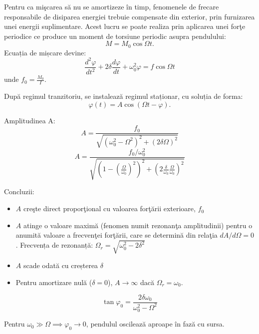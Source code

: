 \documentclass[a4paper]{article}
\renewcommand{\phi}{\varphi} %
\renewcommand{\Omega}{\varOmega} %
\begin{document}
Pentru ca mişcarea să nu se amortizeze în timp, fenomenele de frecare
responsabile de disiparea energiei trebuie compensate din exterior, prin
furnizarea unei energii suplimentare. Acest lucru se poate realiza prin
aplicarea unei forţe periodice ce produce un moment de torsiune periodic asupra
pendulului:
\begin{equation}
	M = M_0 \cos \Omega t \text{.}
\end{equation}
Ecuația de mișcare devine:
\begin{equation}
	\frac{d^2 \phi}{dt^2} + 2 \delta \frac{d \phi}{dt} + \omega_0^2 \phi = f
	\cos \Omega t
\end{equation}
unde $f_0 = \frac{M_0}{I}$.

După regimul tranzitoriu, se instalează regimul staționar, cu soluția de forma:
\begin{equation}
	\phi(t) = A \cos(\Omega t - \phi) \text{.}
\end{equation}

Amplitudinea A:
\begin{equation}
	A = \frac{f_0}{\sqrt{(\omega_0^2 - \Omega^2)^2 + (2 \delta \Omega)^2}}
\end{equation}
\begin{equation}
	A = \frac{f_0 / \omega_0^2}{\sqrt{\left(1 -
			\left(\frac{\Omega}{\omega_0}\right)^2\right)^2 + \left(2
			\frac{\delta}{\omega_0} \frac{\Omega}{\omega_0} \right)^2}}
\end{equation}

Concluzii:
\begin{itemize}
	\item $A$ creşte direct proporţional cu valoarea forţării exterioare, $f_0$
	\item $A$ atinge o valoare maximă (fenomen numit rezonanţa amplitudinii) pentru o anumită valoare a
	      frecvenţei forţării, care se determină din relaţia
	      $dA / d\Omega = 0$. Frecvența de rezonanță:
	      $\Omega_r = \sqrt{\omega_0^2 - 2 \delta^2}$
	\item $A$ scade odată cu creșterea $\delta$
	\item Pentru amortizare nulă ($\delta = 0$), $A \to \infty$ dacă $\Omega_r = \omega_0$.
\end{itemize}

\begin{equation}
	\tan \phi_0 = \frac{2 \delta \omega_0}{\omega_0^2 - \Omega^2}
\end{equation}

Pentru $\omega_0 \gg \Omega \implies \phi_0 \to 0$, pendulul oscilează aproape
în fază cu sursa.
\end{document}
